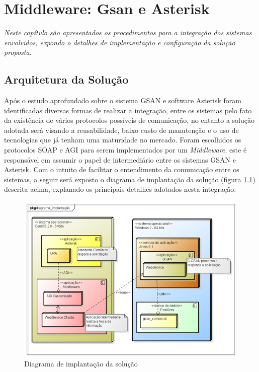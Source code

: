 \chapter[Middleware: GSAN e Asterisk]{\textbf{M}iddleware: \textbf{G}san e \textbf{A}sterisk}

\textit{Neste capítulo são apresentados os procedimentos para a integração dos sistemas envolvidos, expondo o detalhes de implementação e configuração da solução proposta.}


\section{Arquitetura da Solução}

Após o estudo aprofundado sobre o sistema GSAN e software Asterisk foram identificadas diversas formas de realizar a integração, entre os sistemas pelo fato da existência de vários protocolos possíveis de comunicação, no entanto a solução adotada será visando a reusabilidade, baixo custo de manutenção e o uso de tecnologias que já tenham uma maturidade no mercado. Foram escolhidos os protocolos SOAP e AGI para serem implementados por um \textit{Middleware}, este é responsável em assumir o papel de intermediário entre os sistemas GSAN e Asterisk. Com o intuito de facilitar o entendimento da comunicação entre os sistemas, a seguir será exposto o diagrama de implantação da solução (figura \ref{figura:diagramaImplantacao}) descrita acima, explanado os principais detalhes adotados nesta integração:


\begin{figure}[H]
	\centering
	\caption{Diagrama de implantação da solução}
	\label{figura:diagramaImplantacao}
	\includegraphics{figuras/diagrama_implantacao.png}
\end{figure}


